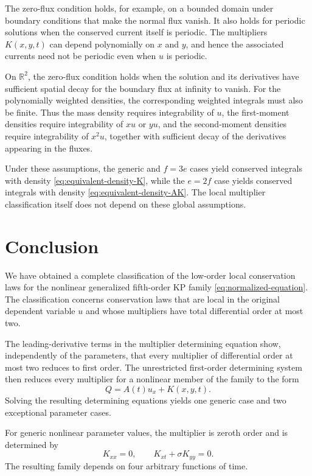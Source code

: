 \documentclass[11pt]{article}
\numberwithin{equation}{section}
\theoremstyle{definition}
\theoremstyle{remark}
\begin{document}
The zero-flux condition holds, for example, on a bounded domain under
boundary conditions that make the normal flux vanish. It also holds
for periodic solutions when the conserved current itself is
periodic. The multipliers
$K(x,y,t)$ can depend polynomially on $x$ and $y$, and hence the
associated currents need not be periodic even when $u$ is periodic.

On $\mathbb{R}^2$, the zero-flux condition holds when the solution
and its derivatives have sufficient spatial decay for the boundary
flux at infinity to vanish. For the polynomially weighted densities,
the corresponding weighted integrals must also be finite. Thus the
mass density requires integrability of $u$, the first-moment
densities require integrability of $xu$ or $yu$, and the
second-moment densities require integrability of $x^2u$, together
with sufficient decay of the derivatives appearing in the fluxes.

Under these assumptions, the generic and $f=3e$ cases yield conserved
integrals with density \eqref{eq:equivalent-density-K}, while the
$e=2f$ case yields conserved integrals with density
\eqref{eq:equivalent-density-AK}. The local multiplier
classification itself does not depend on these global assumptions.
\section{Conclusion}
\label{sec:conclusion}

We have obtained a complete classification of the low-order local
conservation laws for the nonlinear generalized fifth-order KP family
\eqref{eq:normalized-equation}. The classification concerns
conservation laws that are local in the original dependent variable
$u$ and whose multipliers have total differential order at most two.

The leading-derivative terms in the multiplier determining equation
show, independently of the parameters, that every multiplier of
differential order at most two reduces to first order. The
unrestricted first-order determining system then reduces every
multiplier for a nonlinear member of the family to the form
\[
Q=A(t)u_x+K(x,y,t).
\]
Solving the resulting determining equations yields one generic case
and two exceptional parameter cases.

For generic nonlinear parameter values, the multiplier is zeroth
order and is determined by
\[
K_{xx}=0,
\qquad
K_{xt}+\sigma K_{yy}=0.
\]
The resulting family depends on four arbitrary functions of time.
\end{document}
